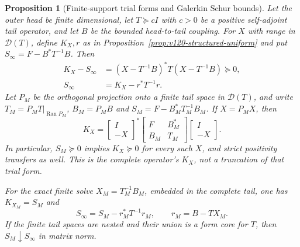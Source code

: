 \documentclass[11pt]{article}
\newtheorem{proposition}[theorem]{Proposition}
\theoremstyle{remark}
\begin{document}
\begin{proposition}[Finite-support trial forms and Galerkin Schur bounds]
\label{prop:v121-finite-trial}
Let the outer head be finite dimensional, let $T\succeq cI$ with
$c>0$ be a positive self-adjoint tail operator, and let $B$ be the
bounded head-to-tail coupling. For $X$ with range in $\mathcal D(T)$,
define $K_X,r$ as in Proposition~\ref{prop:v120-structured-uniform}
and put $S_\infty=F-B^*T^{-1}B$. Then
\begin{align}
 K_X-S_\infty
  &=(X-T^{-1}B)^*T(X-T^{-1}B)\succeq0,
       \label{eq:v121-square}\\
 S_\infty&=K_X-r^*T^{-1}r.\label{eq:v121-residual}
\end{align}
Let $P_M$ be the orthogonal projection onto a finite tail space in $\mathcal D(T)$, and
write $T_M=P_MT|_{\operatorname{Ran}P_M}$, $B_M=P_MB$ and
$S_M=F-B_M^*T_M^{-1}B_M$. If $X=P_MX$, then
\begin{equation}\label{eq:v121-finite-trial}
 K_X=\begin{bmatrix}I\\-X\end{bmatrix}^{*}
       \begin{bmatrix}F&B_M^*\\B_M&T_M\end{bmatrix}
       \begin{bmatrix}I\\-X\end{bmatrix}.
\end{equation}
In particular, $S_M\succeq0$ implies $K_X\succeq0$ for every such
$X$, and strict positivity transfers as well. This is the complete
operator's $K_X$, not a truncation of that trial form.

For the exact finite solve $X_M=T_M^{-1}B_M$, embedded in the complete
tail, one has $K_{X_M}=S_M$ and
\begin{equation}\label{eq:v121-galerkin-defect}
 \boxed{S_\infty=S_M-r_M^*T^{-1}r_M,
 \qquad r_M=B-TX_M.}
\end{equation}
If the finite tail spaces are nested and their union is a form core
for $T$, then $S_M\downarrow S_\infty$ in matrix norm.
\end{proposition}
\end{document}
